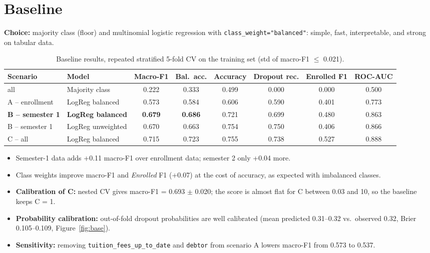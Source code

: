 \documentclass[11pt,a4paper]{article}
\begin{document}
\section{Baseline}
\textbf{Choice:} majority class (floor) and multinomial logistic regression with \texttt{class\_weight="balanced"}: simple, fast, interpretable, and strong on tabular data.

\begin{table}[!htb]
\centering\footnotesize
\setlength{\tabcolsep}{4pt}
\begin{tabular}{@{}llcccccc@{}}
\toprule
Scenario & Model & Macro-F1 & Bal.\ acc. & Accuracy & Dropout rec. & Enrolled F1 & ROC-AUC\\
\midrule
all & Majority class & 0.222 & 0.333 & 0.499 & 0.000 & 0.000 & 0.500\\
A -- enrollment & LogReg balanced & 0.573 & 0.584 & 0.606 & 0.590 & 0.401 & 0.773\\
\textbf{B -- semester 1} & \textbf{LogReg balanced} & \textbf{0.679} & \textbf{0.686} & 0.721 & 0.699 & 0.480 & 0.863\\
B -- semester 1 & LogReg unweighted & 0.670 & 0.663 & 0.754 & 0.750 & 0.406 & 0.866\\
C -- all & LogReg balanced & 0.715 & 0.723 & 0.755 & 0.738 & 0.527 & 0.888\\
\bottomrule
\end{tabular}
\caption{Baseline results, repeated stratified 5-fold CV on the training set (std of macro-F1 $\le$ 0.021).}
\end{table}

\begin{itemize}
\item Semester-1 data adds +0.11 macro-F1 over enrollment data; semester 2 only +0.04 more.
\item Class weights improve macro-F1 and \textit{Enrolled} F1 (+0.07) at the cost of accuracy, as expected with imbalanced classes.
\item \textbf{Calibration of C:} nested CV gives macro-F1 = 0.693 $\pm$ 0.020; the score is almost flat for C between 0.03 and 10, so the baseline keeps C = 1.
\item \textbf{Probability calibration:} out-of-fold dropout probabilities are well calibrated (mean predicted 0.31--0.32 vs.\ observed 0.32, Brier 0.105--0.109, Figure~\ref{fig:base}).
\item \textbf{Sensitivity:} removing \texttt{tuition\_fees\_up\_to\_date} and \texttt{debtor} from scenario A lowers macro-F1 from 0.573 to 0.537.
\end{itemize}
\end{document}
